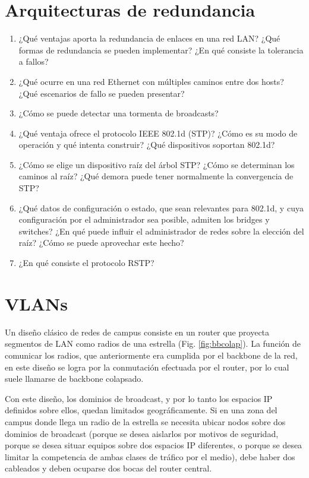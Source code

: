 \section{Arquitecturas de redundancia}
\begin{enumerate}
\item ¿Qué ventajas aporta la redundancia de enlaces en una red LAN? ¿Qué formas de redundancia se pueden implementar? ¿En qué consiste la tolerancia a fallos?
\item ¿Qué ocurre en una red Ethernet con múltiples caminos entre dos hosts? ¿Qué escenarios de fallo se pueden presentar?  
\item ¿Cómo se puede detectar una tormenta de broadcasts?
\item ¿Qué ventaja ofrece el protocolo IEEE 802.1d (STP)? ¿Cómo es su modo de operación y qué intenta construir? ¿Qué dispositivos soportan 802.1d? 
\item ¿Cómo se elige un dispositivo raíz del árbol STP? ¿Cómo se determinan los caminos al raíz? ¿Qué demora puede tener normalmente la convergencia de STP?
\item ¿Qué datos de configuración o estado, que sean relevantes para 802.1d, y cuya configuración por el administrador sea posible, admiten los bridges y switches? ¿En qué puede influir el administrador de redes sobre la elección del raíz? ¿Cómo se puede aprovechar este hecho?
\item ¿En qué consiste el protocolo RSTP?
\end{enumerate}



\section{VLANs}
\label{sub:}
Un diseño clásico de redes de campus consiste en un router que proyecta segmentos de LAN como radios de una estrella (Fig. \ref{fig:bbcolap}). La función de comunicar los radios, que anteriormente era cumplida por el backbone de la red, en este diseño se logra por la conmutación efectuada por el router, por lo cual suele llamarse de backbone colapsado. 

Con este diseño, los dominios de broadcast, y por lo tanto los espacios IP definidos sobre ellos, quedan limitados geográficamente. Si en una zona del campus donde llega un radio de la estrella se necesita ubicar nodos sobre dos dominios de broadcast (porque se desea aislarlos por motivos de seguridad, porque se desea situar equipos sobre dos espacios IP diferentes, o porque se desea limitar la competencia de ambas clases de tráfico por el medio), debe haber dos cableados y deben ocuparse dos bocas del router central. 

